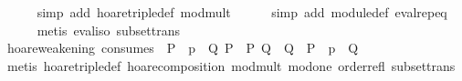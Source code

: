 \begin{isabellebody}
%
\isadelimproof
\ \ \ \ %
\endisadelimproof
%
\isatagproof
{}\isamarkupfalse%
\ {}simp\ add{}\ hoare{}triple{}def\ mod{}mult{}\isanewline
\ \ \ \ \isamarkupfalse%
\ {}simp\ add{}\ module{}def\ eval{}rep{}eq{}\isanewline
\ \ \ \ \isamarkupfalse%
\ {}metis\ eval{}iso\ subset{}trans{}%
\endisatagproof
{\isafoldproof}%
%
\isadelimproof
\isanewline
%
\endisadelimproof
\isanewline
\ \ \isamarkupfalse%
\ hoare{}weakening\ {}consumes\ {}{}{}\ {}{}P\ {}\ p\ {}\ Q{}\ P{}\ {}\ P{}\ Q\ {}\ Q{}{}\ {}\ P{}\ {}\ p\ {}\ Q{}{}\isanewline
%
\isadelimproof
\ \ \ \ %
\endisadelimproof
%
\isatagproof
{}\isamarkupfalse%
\ {}metis\ hoare{}triple{}def\ hoare{}composition\ mod{}mult\ mod{}one\ order{}refl\ subset{}trans{}%
\endisatagproof
{\isafoldproof}%
%
\isadelimproof
\isanewline
%
\endisadelimproof
\isanewline

\end{isabellebody}
